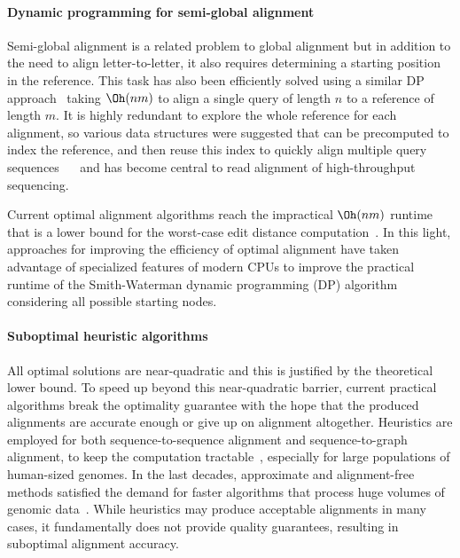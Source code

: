 \paragraph{Dynamic programming for semi-global alignment}
Semi-global alignment is a related problem to global alignment but in addition
to the need to align letter-to-letter, it also requires determining a starting
position in the reference. This task has also been efficiently solved using a
similar DP approach~\cite{sellers1980theory,smith1981identification} taking
$\Oh(nm)$ to align a single query of length $n$ to a reference of length $m$. It
is highly redundant to explore the whole reference for each alignment, so
various data structures were suggested that can be precomputed to index the
reference, and then reuse this index to quickly align multiple query sequences
~\citeyear{pearson1988improved}~\cite{pearson1988improved} and has become
central to read alignment of high-throughput sequencing.

Current optimal alignment algorithms reach the impractical $\Oh(nm)$ runtime
that is a lower bound for the worst-case edit distance
computation~\cite{backurs2015edit}. In this light, approaches for improving the
efficiency of optimal alignment have taken advantage of specialized features of
modern CPUs to improve the practical runtime of the Smith-Waterman dynamic
programming (DP) algorithm~\cite{smith_comparison_1981} considering all possible
starting nodes.

\paragraph{Suboptimal heuristic algorithms}
All optimal solutions are near-quadratic and this is justified by the
theoretical lower bound. To speed up beyond this near-quadratic barrier, current
practical algorithms break the optimality guarantee with the hope that the
produced alignments are accurate enough or give up on alignment altogether.
Heuristics are employed for both sequence-to-sequence alignment and
sequence-to-graph alignment, to keep the computation
tractable~\cite{altschul_basic_1990,langmead_fast_2012,garrison_variation_2018},
especially for large populations of human-sized genomes. In the last decades,
approximate and alignment-free methods satisfied the demand for faster
algorithms that process huge volumes of genomic
data~\cite{kucherov2019evolution}. While heuristics may produce acceptable
alignments in many cases, it fundamentally does not provide quality guarantees,
resulting in suboptimal alignment accuracy.

